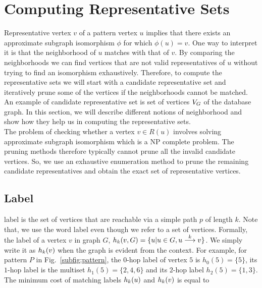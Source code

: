 
\section{Computing Representative Sets}
 Representative vertex $v$ of a pattern vertex $u$ implies that there
 exists an approximate subgraph isomorphism $\phi$ for which $\phi(u) = v$.
 One way to interpret it is that the neighborhood of $u$ matches with
 that of $v$.  By comparing the neighborhoods we can find 
 vertices that are not valid representatives of $u$ without trying to
 find an isomorphism exhaustively. Therefore, to compute the
 representative sets we will start with a candidate 
 representative set and iteratively
 prune some of the vertices if the neighborhoods cannot be matched.
 An example of candidate representative set is set of vertices $\vg$ of the 
 database graph.
  In this section, we will
 describe different notions of neighborhood and show how they
 help us in computing the representative
 sets. \\
The problem of checking whether a vertex $v \in R(u)$
 involves solving
 approximate subgraph isomorphism which is a NP complete
 problem. The pruning methods therefore 
 typically cannot prune all the invalid
 candidate vertices. 
 So, we use an exhaustive enumeration method to prune the remaining
candidate representatives and obtain the exact set of representative
vertices.

 \subsection{\khop Label}
 \khop label 
 is the set of vertices that are reachable via a simple
 path $p$ of length $k$. 
 Note that, we use the word label even though we refer to a set of vertices.
 Formally, the \khop label of a vertex
 $v$ in graph $G$, $\khopl{k}{v,G} = \{u | u \in G, \kpath{u}{v}{k}\}$.
 We simply write it as $\khopl{k}{v}$ when the graph is evident from
 the context. 
For example, for pattern $P$ in
Fig.~\ref{subfig:pattern}, the $0$-hop label of vertex $5$ is $h_0(5)
 = \{5\}$, its $1$-hop label is the multiset $h_1(5) = \{2, 4, 6\}$ 
 and its $2$-hop label $h_2(5) = \{1, 3\}$. The minimum 
 cost of matching \khop labels
 $\khopl{k}{u}$ and $\khopl{k}{v}$ is equal to 


